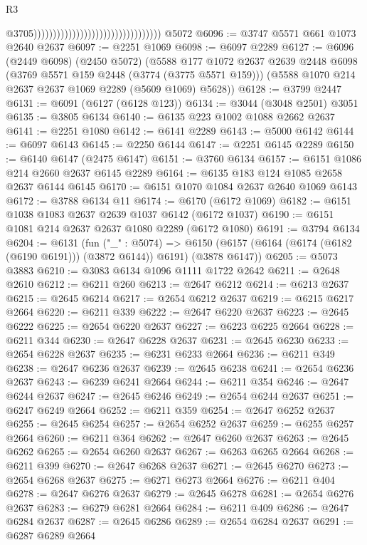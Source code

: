 \begin{lexlean}{R3}
\begin{coremodule}
                                                                      @3705)))))))))))))))))))))))))))))))))
    @5072
@6096 := @3747 @5571 @661 @1073 @2640 @2637
@6097 := @2251 @1069
@6098 := @6097 @2289
@6127 := @6096
    (@2449 @6098)
    (@2450 @5072)
    (@5588
      @177
      @1072
      @2637
      @2639
      @2448
      @6098
      (@3769 @5571 @159 @2448 (@3774 (@3775 @5571 @159)))
      (@5588 @1070 @214 @2637 @2637 @1069 @2289 (@5609 @1069) @5628))
@6128 := @3799 @2447
@6131 := @6091 (@6127 (@6128 @123))
@6134 := @3044 (@3048 @2501) @3051
@6135 := @3805 @6134
@6140 := @6135 @223 @1002 @1088 @2662 @2637
@6141 := @2251 @1080
@6142 := @6141 @2289
@6143 := @5000 @6142
@6144 := @6097 @6143
@6145 := @2250 @6144
@6147 := @2251 @6145 @2289
@6150 := @6140 @6147 (@2475 @6147)
@6151 := @3760 @6134
@6157 := @6151 @1086 @214 @2660 @2637 @6145 @2289
@6164 := @6135 @183 @124 @1085 @2658 @2637 @6144 @6145
@6170 := @6151 @1070 @1084 @2637 @2640 @1069 @6143
@6172 := @3788 @6134 @11
@6174 := @6170 (@6172 @1069)
@6182 := @6151 @1038 @1083 @2637 @2639 @1037 @6142 (@6172 @1037)
@6190 := @6151 @1081 @214 @2637 @2637 @1080 @2289 (@6172 @1080)
@6191 := @3794 @6134
@6204 := @6131
    (fun ("_" : @5074) =>
    @6150 (@6157 (@6164 (@6174 (@6182 (@6190 @6191))) (@3872 @6144)) @6191) (@3878 @6147))
@6205 := @5073 @3883
@6210 := @3083 @6134 @1096 @1111 @1722 @2642
@6211 := @2648 @2610
@6212 := @6211 @260
@6213 := @2647 @6212
@6214 := @6213 @2637
@6215 := @2645 @6214
@6217 := @2654 @6212 @2637
@6219 := @6215 @6217 @2664
@6220 := @6211 @339
@6222 := @2647 @6220 @2637
@6223 := @2645 @6222
@6225 := @2654 @6220 @2637
@6227 := @6223 @6225 @2664
@6228 := @6211 @344
@6230 := @2647 @6228 @2637
@6231 := @2645 @6230
@6233 := @2654 @6228 @2637
@6235 := @6231 @6233 @2664
@6236 := @6211 @349
@6238 := @2647 @6236 @2637
@6239 := @2645 @6238
@6241 := @2654 @6236 @2637
@6243 := @6239 @6241 @2664
@6244 := @6211 @354
@6246 := @2647 @6244 @2637
@6247 := @2645 @6246
@6249 := @2654 @6244 @2637
@6251 := @6247 @6249 @2664
@6252 := @6211 @359
@6254 := @2647 @6252 @2637
@6255 := @2645 @6254
@6257 := @2654 @6252 @2637
@6259 := @6255 @6257 @2664
@6260 := @6211 @364
@6262 := @2647 @6260 @2637
@6263 := @2645 @6262
@6265 := @2654 @6260 @2637
@6267 := @6263 @6265 @2664
@6268 := @6211 @399
@6270 := @2647 @6268 @2637
@6271 := @2645 @6270
@6273 := @2654 @6268 @2637
@6275 := @6271 @6273 @2664
@6276 := @6211 @404
@6278 := @2647 @6276 @2637
@6279 := @2645 @6278
@6281 := @2654 @6276 @2637
@6283 := @6279 @6281 @2664
@6284 := @6211 @409
@6286 := @2647 @6284 @2637
@6287 := @2645 @6286
@6289 := @2654 @6284 @2637
@6291 := @6287 @6289 @2664

\end{coremodule}
\end{lexlean}
